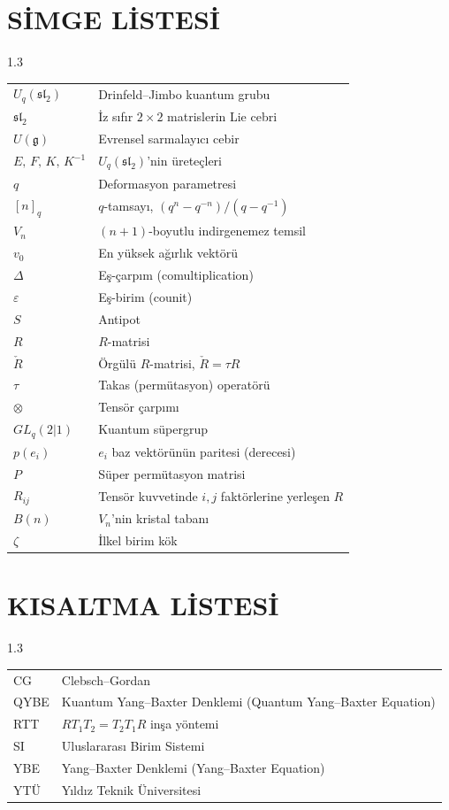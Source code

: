 \documentclass[12pt,a4paper,fleqn]{report}
\numberwithin{equation}{chapter}
\theoremstyle{plain}
\theoremstyle{definition}
\renewcommand{\sl}{\mathfrak{sl}}
\newcommand{\gfrak}{\mathfrak{g}}
\newcommand{\Uq}{U_q(\sl_2)}
\newcommand{\eps}{\varepsilon}
\newcommand{\cop}{\Delta}
\newcommand{\qint}[1]{[#1]_q}
\newcommand{\hwt}{v_0}
\newcommand{\Rcheck}{\check{R}}
\begin{document}
\chapter*{SİMGE LİSTESİ}
\begin{spacing}{1.3}
\noindent
\begin{tabularx}{\textwidth}{@{}p{3.2cm}X@{}}
$\Uq$ & Drinfeld--Jimbo kuantum grubu \\
$\sl_2$ & İz sıfır $2\times2$ matrislerin Lie cebri \\
$U(\gfrak)$ & Evrensel sarmalayıcı cebir \\
$E,\,F,\,K,\,K^{-1}$ & $\Uq$'nin üreteçleri \\
$q$ & Deformasyon parametresi \\
$\qint{n}$ & $q$-tamsayı, $(q^n-q^{-n})/(q-q^{-1})$ \\
$V_n$ & $(n{+}1)$-boyutlu indirgenemez temsil \\
$\hwt$ & En yüksek ağırlık vektörü \\
$\cop$ & Eş-çarpım (comultiplication) \\
$\eps$ & Eş-birim (counit) \\
$S$ & Antipot \\
$R$ & $R$-matrisi \\
$\Rcheck$ & Örgülü $R$-matrisi, $\Rcheck=\tau R$ \\
$\tau$ & Takas (permütasyon) operatörü \\
$\otimes$ & Tensör çarpımı \\
$GL_q(2|1)$ & Kuantum süpergrup \\
$p(e_i)$ & $e_i$ baz vektörünün paritesi (derecesi) \\
$P$ & Süper permütasyon matrisi \\
$R_{ij}$ & Tensör kuvvetinde $i,j$ faktörlerine yerleşen $R$ \\
$B(n)$ & $V_n$'nin kristal tabanı \\
$\zeta$ & İlkel birim kök \\
\end{tabularx}
\end{spacing}
\clearpage

\chapter*{KISALTMA LİSTESİ}
\begin{spacing}{1.3}
\noindent
\begin{tabularx}{\textwidth}{@{}p{3.2cm}X@{}}
CG    & Clebsch--Gordan \\
QYBE  & Kuantum Yang--Baxter Denklemi (Quantum Yang--Baxter Equation) \\
RTT   & $R T_1 T_2 = T_2 T_1 R$ inşa yöntemi \\
SI    & Uluslararası Birim Sistemi \\
YBE   & Yang--Baxter Denklemi (Yang--Baxter Equation) \\
YTÜ   & Yıldız Teknik Üniversitesi \\
\end{tabularx}
\end{spacing}
\clearpage
\end{document}
